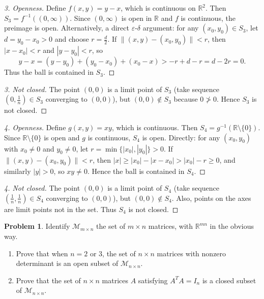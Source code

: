 \documentclass[11pt,a4paper]{article}
\theoremstyle{definition}
\newtheorem{problem}[definition]{Problem}
\theoremstyle{plain}
\newcommand{\R}{\mathbb{R}}
\begin{document}
\begin{proof}[3. Openness]
	Define \(f(x,y) = y - x\), which is continuous on \(\mathbb{R}^2\). Then \(S_3 = f^{-1}((0,\infty))\). Since \((0,\infty)\) is open in \(\mathbb{R}\) and \(f\) is continuous, the preimage is open. Alternatively, a direct \(\varepsilon\)-\(\delta\) argument: for any \((x_0,y_0) \in S_3\), let \(d = y_0 - x_0 > 0\) and choose \(r = \frac{d}{2}\). If \(\|(x,y)-(x_0,y_0)\| < r\), then \(|x-x_0| < r\) and \(|y-y_0| < r\), so
	\[
		y - x = (y-y_0) + (y_0 - x_0) + (x_0 - x) > -r + d - r = d - 2r = 0.
	\]
	Thus the ball is contained in \(S_3\).
\end{proof}

\begin{proof}[3. Not closed]
	The point \((0,0)\) is a limit point of \(S_3\) (take sequence \((0,\frac{1}{n}) \in S_3\) converging to \((0,0)\)), but \((0,0) \notin S_3\) because \(0 \not> 0\). Hence \(S_3\) is not closed.
\end{proof}

\begin{proof}[4. Openness]
	Define \(g(x,y) = xy\), which is continuous. Then \(S_4 = g^{-1}(\mathbb{R}\setminus\{0\})\). Since \(\mathbb{R}\setminus\{0\}\) is open and \(g\) is continuous, \(S_4\) is open. Directly: for any \((x_0,y_0)\) with \(x_0 \neq 0\) and \(y_0 \neq 0\), let \(r = \min\{|x_0|, |y_0|\} > 0\). If \(\|(x,y)-(x_0,y_0)\| < r\), then \(|x| \ge |x_0| - |x-x_0| > |x_0| - r \ge 0\), and similarly \(|y| > 0\), so \(xy \neq 0\). Hence the ball is contained in \(S_4\).
\end{proof}

\begin{proof}[4. Not closed]
	The point \((0,0)\) is a limit point of \(S_4\) (take sequence \((\frac{1}{n},\frac{1}{n}) \in S_4\) converging to \((0,0)\)), but \((0,0) \notin S_4\). Also, points on the axes are limit points not in the set. Thus \(S_4\) is not closed.
\end{proof}

\begin{problem}
Identify $\mathcal{M}_{m \times n}$ the set of $m \times n$ matrices, with
$\R^{mn}$ in the obvious way.
\begin{enumerate}
	\item Prove that when $n = 2$ or $3$, the set of $n \times n$ matrices with nonzero determinant is
	      an open subset of $\mathcal{M}_{n \times n}$.
	\item Prove that the set of $n \times n$ matrices $A$ satisfying $A^T A = I_n$ is a closed subset
	      of $\mathcal{M}_{n \times n}$.
\end{enumerate}
\end{problem}
\end{document}
